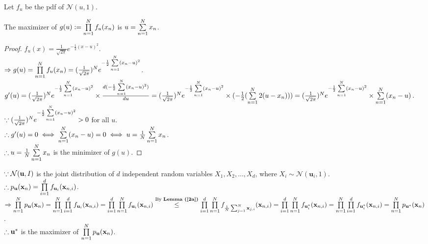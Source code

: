 \renewcommand{\u}{\mathbf{u}}

\begin{pr}
Let $f_u$ be the pdf of $\mathcal{N}(u, 1)$.
\begin{lm}\label{2a}
The maximizer of $g(u):=\prod\limits_{n=1}^Nf_u(x_n)$ is $u=\sum\limits_{n=1}^Nx_n$.
\begin{proof}
$f_u(x)=\frac1{\sqrt{2\pi}}e^{-\frac12(x-u)^2}$.\\
$\Rightarrow g(u)=\prod\limits_{n=1}^Nf_u(x_n)=(\frac1{\sqrt{2\pi}})^Ne^{-\frac12\sum\limits_{n=1}^N(x_n-u)^2}$.\\
$g'(u)=(\frac1{\sqrt{2\pi}})^Ne^{-\frac12\sum\limits_{n=1}^N(x_n-u)^2}\times\frac{d(-\frac12\sum\limits_{n=1}^N(x_n-u)^2)}{du}=(\frac1{\sqrt{2\pi}})^Ne^{-\frac12\sum\limits_{n=1}^N(x_n-u)^2}\times(-\frac12(\sum\limits_{n=1}^N2(u-x_n)))=(\frac1{\sqrt{2\pi}})^Ne^{-\frac12\sum\limits_{n=1}^N(x_n-u)^2}\times\sum\limits_{n=1}^N(x_n-u)$.\\
$\because(\frac1{\sqrt{2\pi}})^Ne^{-\frac12\sum\limits_{n=1}^N(x_n-u)^2}>0$ for all $u$.\\
$\therefore g'(u)=0\iff\sum\limits_{n=1}^N(x_n-u)=0\iff u=\frac1N\sum\limits_{n=1}^Nx_n$.\\
$\therefore u=\frac1N\sum\limits_{n=1}^Nx_n$ is the minimizer of $g(u)$.
\end{proof}
\end{lm}
$\cuz\mathcal{N}(\u, I)$ is the joint distribution of $d$ independent random variables $X_1, X_2, \dots, X_d$, where $X_i\sim\mathcal{N}(\u_i, 1)$.\\
$\so p_\u(\x_n)=\prodl_{i=1}^df_{\u_i}(\x_{n, i})$.\\
$\then\prodl_{n=1}^Np_\u(\x_n)=\prodl_{n=1}^N\prodl_{i=1}^df_{\u_i}(\x_{n, i})=\prodl_{i=1}^d\prodl_{n=1}^Nf_{\u_i}(\x_{n, i})\overtext{By \rflm{2a}}\leq\prodl_{i=1}^d\prodl_{n=1}^Nf_{\frac1N\sum_{j=1}^N\x_{j, i}}(\x_{n, i})=\prodl_{i=1}^d\prodl_{n=1}^Nf_{\u^*_i}(\x_{n, i})=\prodl_{n=1}^N\prodl_{i=1}^df_{\u^*_i}(\x_{n, i})=\prodl_{n=1}^Np_{\u^*}(\x_n)$.\\
$\so\u^*$ is the maximizer of $\prodl_{n=1}^Np_\u(\x_n)$.
\end{pr}
